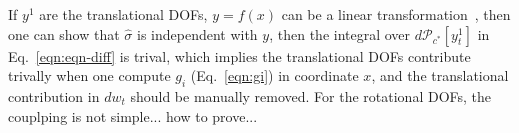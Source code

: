 \documentclass[aip,jcp,a4paper,reprint,onecolumn]{revtex4-1}
\newcommand{\recheck}[1]{{\color{red} #1}}
\newcommand{\pathmeas}{d\mathcal P}
\begin{document}
If $y^1$ are the translational DOFs, $y = f(x)$ can be a linear
transformation~\cite{littlejohn1997gauge}, then one can show that $\hat\sigma$ is independent
with $y$,
then the integral over $\pathmeas_{c^\ast}[y^1_t]$ in
Eq.~\eqref{eqn:eqn-diff} is trival, which implies the translational
DOFs contribute trivally when one compute $g_i$ (Eq.~\eqref{eqn:gi})
in coordinate $x$, and the translational contribution in $dw_t$ should
be manually removed. \recheck{For the rotational DOFs, the couplping
  is not simple... how to prove...}

\end{document}
